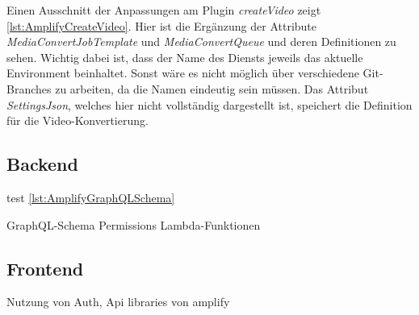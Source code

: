 Einen Ausschnitt der Anpassungen am Plugin \textit{createVideo} zeigt \autoref{lst:AmplifyCreateVideo}. Hier ist die Ergänzung der Attribute \textit{MediaConvertJobTemplate} und \textit{MediaConvertQueue} und deren Definitionen zu sehen. Wichtig dabei ist, dass der Name des Diensts jeweils das aktuelle Environment beinhaltet. Sonst wäre es nicht möglich über verschiedene Git-Branches zu arbeiten, da die Namen eindeutig sein müssen. Das Attribut \textit{SettingsJson}, welches hier nicht vollständig dargestellt ist, speichert die Definition für die Video-Konvertierung.



\subsection{Backend}

test \autoref{lst:AmplifyGraphQLSchema}




GraphQL-Schema
Permissions
Lambda-Funktionen

\subsection{Frontend}

Nutzung von Auth, Api libraries von amplify

